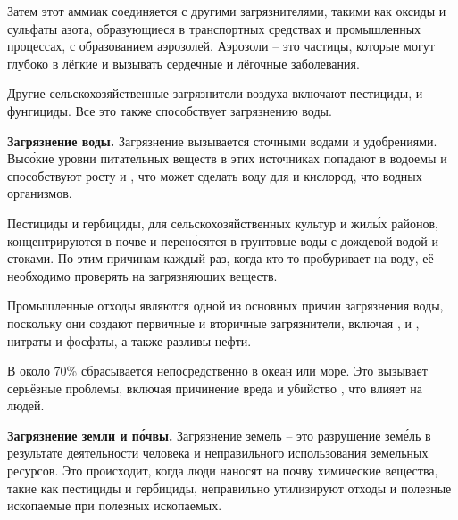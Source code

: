 Затем этот  аммиак соединяется с другими загрязнителями, такими как оксиды и сульфаты азота, образующиеся в транспортных средствах и промышленных процессах, с образованием аэрозолей. Аэрозоли -- это  частицы, которые могут  глубоко в лёгкие и вызывать сердечные и лёгочные заболевания.

Другие сельскохозяйственные загрязнители воздуха включают пестициды,  и фунгициды. Все это также способствует загрязнению воды.

\textbf{Загрязнение воды.}
Загрязнение  вызывается сточными водами и удобрениями. Выс\'{о}кие уровни питательных веществ в этих источниках попадают в водоемы и способствуют росту  и , что может сделать воду  для  и  кислород, что  водных организмов.

Пестициды и гербициды,  для сельскохозяйственных культур и жил\'{ы}х районов, концентрируются в почве и перен\'{о}сятся в грунтовые воды с дождевой водой и стоками. По этим причинам каждый раз, когда кто-то пробуривает  на воду, её необходимо проверять на  загрязняющих веществ.

Промышленные отходы являются одной из основных причин загрязнения воды, поскольку они создают первичные и вторичные загрязнители, включая ,  и , нитраты и фосфаты, а также разливы нефти.

В  около 70\%  сбрасывается непосредственно в океан или море. Это вызывает серьёзные проблемы, включая причинение вреда и убийство , что  влияет на людей.

\textbf{Загрязнение земли и п\'{о}чвы.}
Загрязнение земель -- это разрушение зем\'{е}ль в результате деятельности человека и неправильного использования земельных ресурсов. Это происходит, когда люди наносят на почву химические вещества, такие как пестициды и гербициды, неправильно утилизируют отходы и   полезные ископаемые при  полезных ископаемых.

